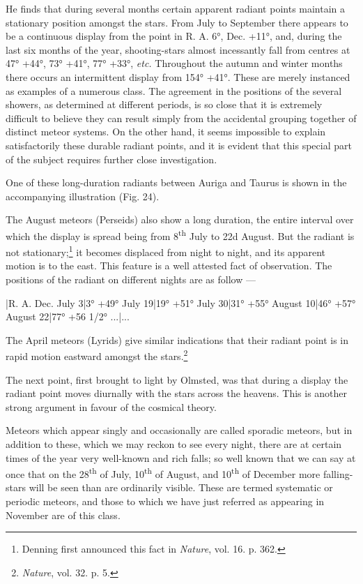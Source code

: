 \documentclass[a4paper, 12pt, oneside, polutonikogreek, english]{article}
\begin{document}
He finds that during several months certain apparent radiant points maintain a stationary position amongst the stars. From July to September there appears to be a continuous display from the point in R. A. 6°, Dec. +11°, and, during the last six months of the year, shooting-stars almost incessantly fall from centres at 47° +44°, 73° +41°, 77° +33°, \emph{etc.} Throughout the autumn and winter months there occurs an intermittent display from 154° +41°. These are merely instanced as examples of a numerous class. The agreement in the positions of the several showers, as determined at different periods, is so close that it is extremely difficult to believe they can result simply from the accidental grouping together of distinct meteor systems. On the other hand, it seems impossible to explain satisfactorily these durable radiant points, and it is evident that this special part of the subject requires further close investigation.

One of these long-duration radiants between Auriga and Taurus is shown in the accompanying illustration (Fig. 24).

The August meteors (Perseids) also show a long duration, the entire interval over which the display is spread being from 8\textsuperscript{th} July to 22d August. But the radiant is not stationary;\footnote{Denning first announced this fact in \emph{Nature}, vol. 16. p. 362.} it becomes displaced from night to night, and its apparent motion is to the east. This feature is a well attested fact of observation. The positions of the radiant on different nights are as follow ---

|R. A. Dec. 
July 3|3° +49° 
July 19|19° +51° 
July 30|31° +55° 
August 10|46° +57° 
August 22|77° +56 1/2° 
...|...

The April meteors (Lyrids) give similar indications that their radiant point is in rapid motion eastward amongst the stars.\footnote{\emph{Nature}, vol. 32. p. 5.}

The next point, first brought to light by Olmsted, was that during a display the radiant point moves diurnally with the stars across the heavens. This is another strong argument in favour of the cosmical theory.

Meteors which appear singly and occasionally are called sporadic meteors, but in addition to these, which we may reckon to see every night, there are at certain times of the year very well-known and rich falls; so well known that we can say at once that on the 28\textsuperscript{th} of July, 10\textsuperscript{th} of August, and 10\textsuperscript{th} of December more falling-stars will be seen than are ordinarily visible. These are termed systematic or periodic meteors, and those to which we have just referred as appearing in November are of this class.
\end{document}

